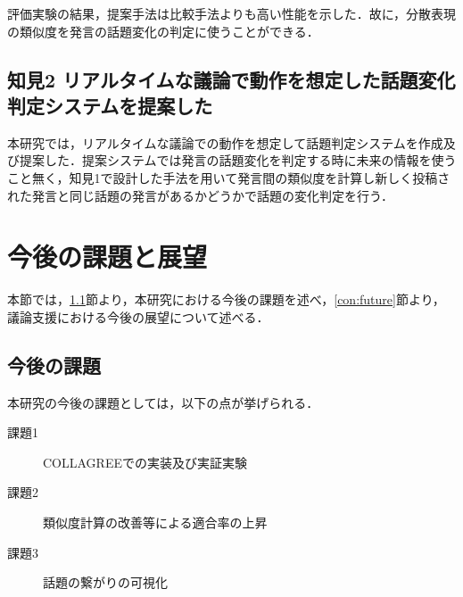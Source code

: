 評価実験の結果，提案手法は比較手法よりも高い性能を示した．故に，分散表現の類似度を発言の話題変化の判定に使うことができる．

\subsection*{知見2 リアルタイムな議論で動作を想定した話題変化判定システムを提案した}
本研究では，リアルタイムな議論での動作を想定して話題判定システムを作成及び提案した．提案システムでは発言の話題変化を判定する時に未来の情報を使うこと無く，知見1で設計した手法を用いて発言間の類似度を計算し新しく投稿された発言と同じ話題の発言があるかどうかで話題の変化判定を行う．

\section{今後の課題と展望}
\label{con:task_and_future}
本節では，\ref{con:task}節より，本研究における今後の課題を述べ，\ref{con:future}節より，議論支援における今後の展望について述べる．
\subsection{今後の課題}
\label{con:task}
本研究の今後の課題としては，以下の点が挙げられる．
\begin{description}
  \item[課題1] COLLAGREEでの実装及び実証実験
  \item[課題2] 類似度計算の改善等による適合率の上昇
  \item[課題3] 話題の繋がりの可視化
\end{description}
